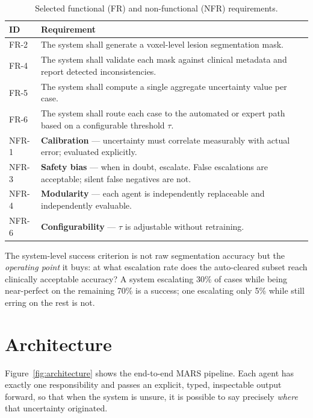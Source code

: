 \documentclass[11pt,a4paper]{article}
\begin{document}
\begin{table}[htbp]
\centering
\caption{Selected functional (FR) and non-functional (NFR) requirements.}
\label{tab:reqs}
\small
\begin{tabular}{p{1.4cm}p{10.5cm}}
\toprule
\textbf{ID} & \textbf{Requirement} \\
\midrule
FR-2 & The system shall generate a voxel-level lesion segmentation mask. \\
FR-4 & The system shall validate each mask against clinical metadata and report detected inconsistencies. \\
FR-5 & The system shall compute a single aggregate uncertainty value per case. \\
FR-6 & The system shall route each case to the automated or expert path based on a configurable threshold $\tau$. \\
NFR-1 & \textbf{Calibration} --- uncertainty must correlate measurably with actual error; evaluated explicitly. \\
NFR-3 & \textbf{Safety bias} --- when in doubt, escalate. False escalations are acceptable; silent false negatives are not. \\
NFR-4 & \textbf{Modularity} --- each agent is independently replaceable and independently evaluable. \\
NFR-6 & \textbf{Configurability} --- $\tau$ is adjustable without retraining. \\
\bottomrule
\end{tabular}
\end{table}

\begin{keytakeaway}
The system-level success criterion is not raw segmentation accuracy but the \emph{operating point} it buys: at what escalation rate does the auto-cleared subset reach clinically acceptable accuracy? A system escalating 30\% of cases while being near-perfect on the remaining 70\% is a success; one escalating only 5\% while still erring on the rest is not.
\end{keytakeaway}

\section{Architecture}
\label{sec:architecture}

Figure~\ref{fig:architecture} shows the end-to-end MARS pipeline. Each agent has exactly one responsibility and passes an explicit, typed, inspectable output forward, so that when the system is unsure, it is possible to say precisely \emph{where} that uncertainty originated.
\end{document}
